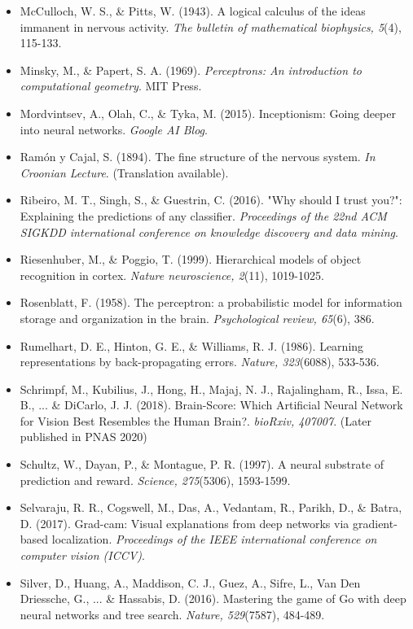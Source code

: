 \documentclass[11pt,a4paper]{article}
\begin{document}
\begin{itemize}
    \item McCulloch, W. S., \& Pitts, W. (1943). A logical calculus of the ideas immanent in nervous activity. \textit{The bulletin of mathematical biophysics, 5}(4), 115-133.
    \item Minsky, M., \& Papert, S. A. (1969). \textit{Perceptrons: An introduction to computational geometry}. MIT Press.
    \item Mordvintsev, A., Olah, C., \& Tyka, M. (2015). Inceptionism: Going deeper into neural networks. \textit{Google AI Blog}.
    \item Ramón y Cajal, S. (1894). The fine structure of the nervous system. \textit{In Croonian Lecture}. (Translation available).
    \item Ribeiro, M. T., Singh, S., \& Guestrin, C. (2016). "Why should I trust you?": Explaining the predictions of any classifier. \textit{Proceedings of the 22nd ACM SIGKDD international conference on knowledge discovery and data mining}.
    \item Riesenhuber, M., \& Poggio, T. (1999). Hierarchical models of object recognition in cortex. \textit{Nature neuroscience, 2}(11), 1019-1025.
    \item Rosenblatt, F. (1958). The perceptron: a probabilistic model for information storage and organization in the brain. \textit{Psychological review, 65}(6), 386.
    \item Rumelhart, D. E., Hinton, G. E., \& Williams, R. J. (1986). Learning representations by back-propagating errors. \textit{Nature, 323}(6088), 533-536.
    \item Schrimpf, M., Kubilius, J., Hong, H., Majaj, N. J., Rajalingham, R., Issa, E. B., ... \& DiCarlo, J. J. (2018). Brain-Score: Which Artificial Neural Network for Vision Best Resembles the Human Brain?. \textit{bioRxiv, 407007}. (Later published in PNAS 2020)
    \item Schultz, W., Dayan, P., \& Montague, P. R. (1997). A neural substrate of prediction and reward. \textit{Science, 275}(5306), 1593-1599.
    \item Selvaraju, R. R., Cogswell, M., Das, A., Vedantam, R., Parikh, D., \& Batra, D. (2017). Grad-cam: Visual explanations from deep networks via gradient-based localization. \textit{Proceedings of the IEEE international conference on computer vision (ICCV)}.
    \item Silver, D., Huang, A., Maddison, C. J., Guez, A., Sifre, L., Van Den Driessche, G., ... \& Hassabis, D. (2016). Mastering the game of Go with deep neural networks and tree search. \textit{Nature, 529}(7587), 484-489.

\end{itemize}
\end{document}
